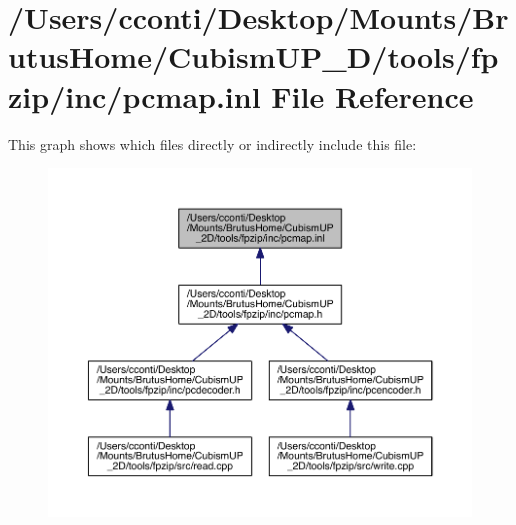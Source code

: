 \hypertarget{pcmap_8inl}{}\section{/\+Users/cconti/\+Desktop/\+Mounts/\+Brutus\+Home/\+Cubism\+U\+P\+\_\+D/tools/fpzip/inc/pcmap.inl File Reference}
\label{pcmap_8inl}
This graph shows which files directly or indirectly include this file\+:\nopagebreak
\begin{figure}[H]
\begin{center}
\leavevmode
\includegraphics[width=350pt]{df/dfb/pcmap_8inl__dep__incl}
\end{center}
\end{figure}
